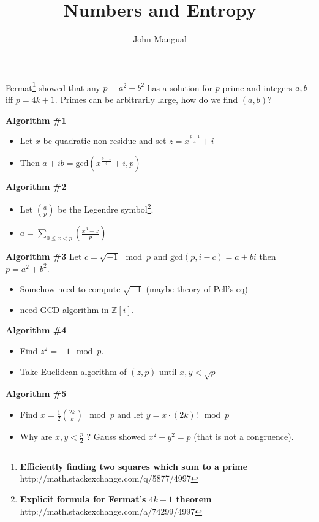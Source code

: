 \documentclass[12pt]{article}
\title{Numbers and Entropy}
\author{John Mangual}
\date{}
\begin{document}
{\selectfont

\maketitle



\noindent Fermat\footnote{\textbf{Efficiently finding two squares which sum to a prime} \tabto{9cm} http://math.stackexchange.com/q/5877/4997} showed that any $p = a^2 + b^2$ has a solution for $p$ prime and integers $a,b$ iff $p = 4k+1$.  Primes can be arbitrarily large, how do we find $(a,b)$? \newline

\noindent \textbf{Algorithm \#1 } 
\begin{itemize}
\item Let $x$ be quadratic non-residue and set $z=x^{\frac{p-1}{4}} + i $
\item Then $a + ib = \mathrm{gcd}(x^{\frac{p-1}{4}} + i ,p)$
\end{itemize}

\noindent \textbf{Algorithm \#2 } 
\begin{itemize}
\item Let $(\frac{a}{p})$ be the Legendre symbol\footnote{\textbf{Explicit formula for Fermat's $4k+1$ theorem} \tabto{9cm} http://math.stackexchange.com/a/74299/4997}.
\item $a = \sum_{0 \leq x < p} (\frac{x^3 - x}{p})$
\end{itemize}

\noindent \textbf{Algorithm \#3 } 
Let $c = \sqrt{-1} \mod p$ and $\mathrm{gcd}(p, i-c) = a+bi$ then $p = a^2 + b^2$. 
\begin{itemize}
\item Somehow need to compute $\sqrt{-1}$ (maybe theory of Pell's eq)
\item need GCD algorithm in $\mathbb{Z}[i]$.
\end{itemize}

\noindent \textbf{Algorithm \#4 }
\begin{itemize}
\item Find $z^2 = -1 \mod p$.
\item Take Euclidean algorithm of $(z,p) $ until $x,y < \sqrt{p}$
\end{itemize}

\noindent \textbf{Algorithm \#5 }
\begin{itemize}
\item Find $x = \frac{1}{2}\binom{2k}{k} \mod p$ and let  $y = x \cdot (2k)! \mod p$
\item {\color{gray} Why are $x,y < \frac{p}{2}$ ?} Gauss showed $x^2 + y^2 = p$ (that is not a congruence).
\end{itemize}

}
\end{document}
